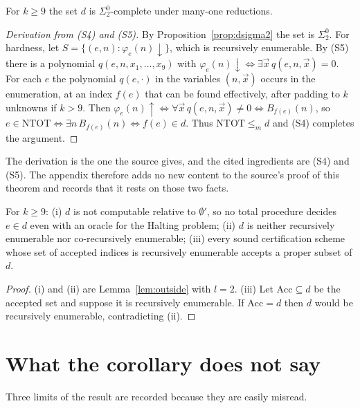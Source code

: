 \begin{theorem}
\label{thm:dcomplete}
For $k\ge9$ the set $d$ is $\Sigma^0_2$-complete under many-one reductions.
\end{theorem}

\begin{proof}[Derivation from (S4) and (S5)]
By Proposition~\ref{prop:dsigma2} the set is $\Sigma^0_2$. For hardness, let $S=\{(e,n):\varphi_e(n)\downarrow\}$, which is recursively enumerable. By (S5) there is a polynomial $q(e,n,x_1,\dots,x_9)$ with $\varphi_e(n)\downarrow\iff\exists\vec x\,q(e,n,\vec x)=0$. For each $e$ the polynomial $q(e,\cdot)$ in the variables $(n,\vec x)$ occurs in the enumeration, at an index $f(e)$ that can be found effectively, after padding to $k$ unknowns if $k>9$. Then $\varphi_e(n)\uparrow\iff\forall\vec x\,q(e,n,\vec x)\neq0\iff B_{f(e)}(n)$, so $e\in\mathrm{NTOT}\iff\exists n\,B_{f(e)}(n)\iff f(e)\in d$. Thus $\mathrm{NTOT}\le_m d$ and (S4) completes the argument.
\end{proof}

The derivation is the one the source gives, and the cited ingredients are (S4) and (S5). The appendix therefore adds no new content to the source's proof of this theorem and records that it rests on those two facts.

\begin{corollary}[Derived]
\label{cor:dconsequences}
For $k\ge9$: (i) $d$ is not computable relative to $\emptyset'$, so no total procedure decides $e\in d$ even with an oracle for the Halting problem; (ii) $d$ is neither recursively enumerable nor co-recursively enumerable; (iii) every sound certification scheme whose set of accepted indices is recursively enumerable accepts a proper subset of $d$.
\end{corollary}

\begin{proof}
(i) and (ii) are Lemma~\ref{lem:outside} with $l=2$. (iii) Let $\mathrm{Acc}\subseteq d$ be the accepted set and suppose it is recursively enumerable. If $\mathrm{Acc}=d$ then $d$ would be recursively enumerable, contradicting (ii).
\end{proof}

\section{What the corollary does not say}

Three limits of the result are recorded because they are easily misread.

